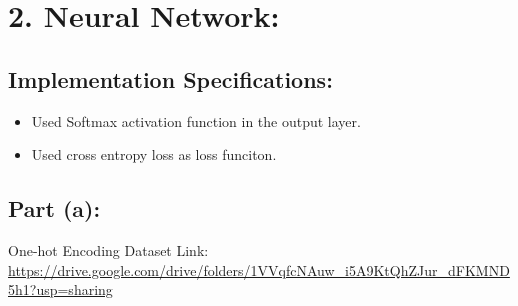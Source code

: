 \documentclass[a4 paper]{article}
\begin{document}
\section*{2. Neural Network:}

\subsection*{Implementation Specifications:}
\begin{itemize}
\item Used Softmax activation function in the output layer.
\item Used cross entropy loss as loss funciton.
\end{itemize}

\subsection*{Part (a):}
One-hot Encoding Dataset Link: \url{https://drive.google.com/drive/folders/1VVqfcNAuw_i5A9KtQhZJur_dFKMND5h1?usp=sharing}
\end{document}

